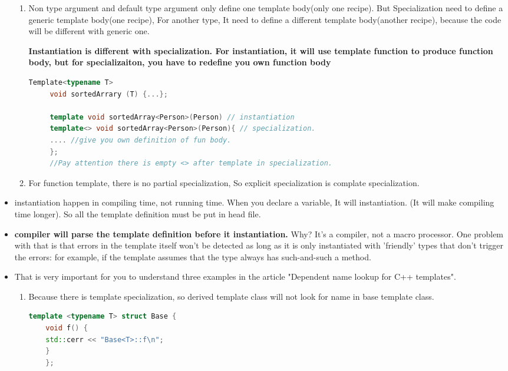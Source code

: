 \documentclass[a4paper,12pt,twoside]{book}
\begin{document}
\begin{itemize}
\begin{enumerate}
	 \item Non type argument and default type argument only define one template body(only one recipe). But Specialization need to define a generic template body(one recipe), For another type, It need to define a different template body(another recipe), because the code will be different with generic one.
	 
	 \textbf{Instantiation is different with specialization.  For instantiation, it will use template function to produce function body, but for specializaiton, you have to redefine you own function body }
	 
	 \begin{lstlisting}[frame=single, language=c++]
	 Template<typename T>
	 void sortedArrary (T) {...};
	 
	 template void sortedArray<Person>(Person) // instantiation
	 template<> void sortedArray<Person>(Person){ // specialization.
	 .... //give you own definition of fun body.
	 };
	 //Pay attention there is empty <> after template in specialization.
	 \end{lstlisting}
	 
	 
	 \item For function template, there is no partial specialization, So explicit specialization is complate specialization.
\end{enumerate}


\item instantiation happen in compiling time, not running time. When you declare a variable, It will instantiation. (It will make compiling time longer). So all the template definition must be put in head file. 		
	
\item \textbf{compiler will parse the template definition before it instantiation.} Why? It's a compiler, not a macro processor. One problem with that is that errors in the template itself won't be detected as long as it is only instantiated with 'friendly' types that don't trigger the errors: for example, if the template assumes that the type always has such-and-such a method.

\item That is very important for you to understand three examples in the article "Dependent name lookup for C++ templates". 
\begin{enumerate}
	\item Because there is template specialization, so derived template class will not look for name in base template class.
	\begin{lstlisting}[frame=single, language=c++]
	template <typename T> struct Base {
	void f() {
	std::cerr << "Base<T>::f\n";
	}
	};
	

\end{lstlisting}
\end{enumerate}
\end{itemize}
\end{document}
